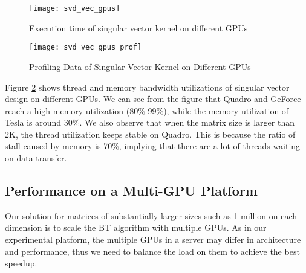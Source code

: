 \begin{figure}[hbpt]
\centering
\texttt{[image: svd\_vec\_gpus]}
\caption{Execution time of singular vector kernel on different GPUs}
\label{fig:svd_vec}
\vspace{-0.2in}
\end{figure}

\begin{figure}[hbpt]
\centering
\texttt{[image: svd\_vec\_gpus\_prof]}
\caption{Profiling Data of Singular Vector Kernel on Different GPUs}
\label{fig:svd_vec_prof}
\vspace{-0.15in}
\end{figure}

Figure \ref{fig:svd_vec_prof} shows thread and memory bandwidth utilizations of singular vector design on different GPUs. 
We can see from the figure that Quadro and GeForce reach a high memory utilization (80\%-99\%), while the memory utilization of Tesla is around 30\%. 
We also observe that when the matrix size is larger than 2K, the thread utilization keeps stable on Quadro. 
This is because the ratio of stall caused by memory is 70\%, implying that there are a lot of threads waiting on data transfer.


\subsection{Performance on a Multi-GPU Platform}

Our solution for matrices of substantially larger sizes such
as 1 million on each dimension is to scale the BT algorithm
with multiple GPUs.
As in our experimental platform, the multiple GPUs in a server may differ
in architecture and performance, thus we need to balance the load on them
to achieve the best speedup.

